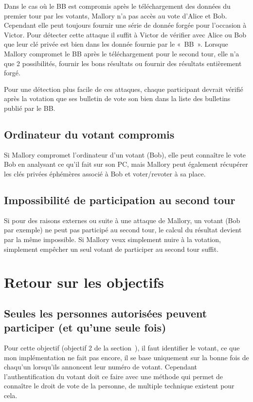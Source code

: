 \documentclass[../report]{subfiles}
\begin{document}
Dans le cas où le BB est compromis après le téléchargement des données du premier tour par les votants, Mallory n'a pas accès au vote
d'Alice et Bob.
Cependant elle peut toujours fournir une série de donnée forgée pour l'occasion à Victor. 
Pour détecter cette attaque il suffit à Victor de vérifier avec Alice ou Bob que leur clé privée est bien dans les donnée fournie par le «~BB~». 
Lorsque Mallory compromet le BB après le téléchargement pour le second tour, elle n'a que 2 possibilités, fournir les bons résultats 
ou fournir des résultats entièrement forgé.

Pour une détection plus facile de ces attaques, chaque participant devrait vérifié après la votation que ses bulletin de vote son bien dans la liste
des bulletins publié par le BB.

\section{Ordinateur du votant compromis}

Si Mallory compromet l'ordinateur d'un votant (Bob), elle peut connaître le vote Bob en analysant ce qu'il fait sur son PC, 
mais Mallory peut également récupérer les clés privées éphémères associé à Bob et voter/revoter à sa place.

\section{Impossibilité de participation au second tour}

Si pour des raisons externes ou suite à une attaque de Mallory, un votant (Bob par exemple) ne peut pas participé au second tour, le 
calcul du résultat devient par la même impossible. Si Mallory veux simplement nuire à la votation, simplement empêcher un seul votant 
de participer au second tour suffit.

\chapter{Retour sur les objectifs}

\section{Seules les personnes autorisées peuvent participer (et qu'une seule fois)}

Pour cette objectif (objectif 2 de la section~),
il faut identifier le votant, ce que mon implémentation ne fait pas encore, il se base 
uniquement sur la bonne fois de chaqu'un lorsqu'ils annoncent leur numéro de votant.
Cependant l'authentification du votant doit ce faire avec une méthode qui permet de connaître
le droit de vote de la personne, de multiple technique existent pour cela.
\end{document}
